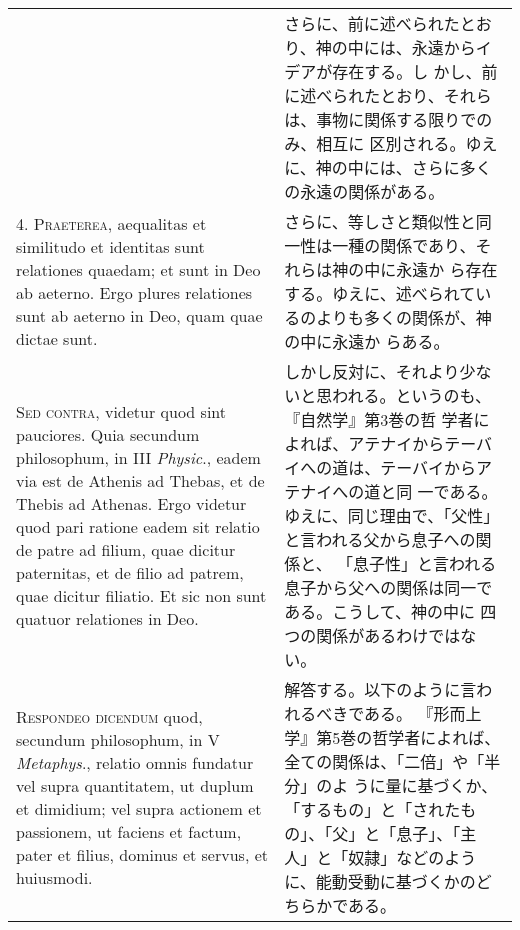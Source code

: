 \documentclass[10pt]{jsarticle} %
\begin{document}
\begin{longtable}{p{21em}p{21em}}
&


さらに、前に述べられたとおり、神の中には、永遠からイデアが存在する。し
 かし、前に述べられたとおり、それらは、事物に関係する限りでのみ、相互に
 区別される。ゆえに、神の中には、さらに多くの永遠の関係がある。

\\



4. {\scshape Praeterea}, aequalitas et similitudo et identitas sunt relationes
quaedam; et sunt in Deo ab aeterno. Ergo plures relationes sunt ab
aeterno in Deo, quam quae dictae sunt.


&

さらに、等しさと類似性と同一性は一種の関係であり、それらは神の中に永遠か
 ら存在する。ゆえに、述べられているのよりも多くの関係が、神の中に永遠か
 らある。


\\



{\scshape Sed contra}, videtur quod sint pauciores. Quia secundum philosophum, in
III {\itshape Physic}., eadem via est de Athenis ad Thebas, et de Thebis ad
Athenas. Ergo videtur quod pari ratione eadem sit relatio de patre ad
filium, quae dicitur paternitas, et de filio ad patrem, quae dicitur
filiatio. Et sic non sunt quatuor relationes in Deo.


&

しかし反対に、それより少ないと思われる。というのも、『自然学』第3巻の哲
 学者によれば、アテナイからテーバイへの道は、テーバイからアテナイへの道と同
 一である。ゆえに、同じ理由で、「父性」と言われる父から息子への関係と、
 「息子性」と言われる息子から父への関係は同一である。こうして、神の中に
 四つの関係があるわけではない。


\\



{\scshape Respondeo dicendum} quod, secundum philosophum, 
in V {\itshape Metaphys}., relatio
omnis fundatur vel supra quantitatem, ut duplum et dimidium; vel supra
actionem et passionem, ut faciens et factum, pater et filius, dominus et
servus, et huiusmodi. 


&

解答する。以下のように言われるべきである。
『形而上学』第5巻の哲学者によれば、全ての関係は、「二倍」や「半分」のよ
 うに量に基づくか、「するもの」と「されたもの」、「父」と「息子」、「主
 人」と「奴隷」などのように、能動受動に基づくかのどちらかである。




\end{longtable}
\end{document}
